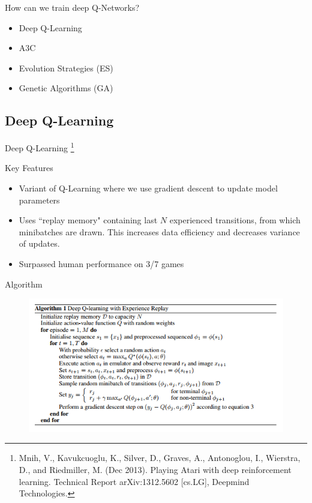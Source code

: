 \documentclass{beamer}
\begin{document}
	\begin{frame}
		How can we train deep Q-Networks?
		\begin{itemize}
			\item Deep Q-Learning
			\item A3C
			\item Evolution Strategies (ES)
			\item Genetic Algorithms (GA)
		\end{itemize}
	\end{frame}
	
	\subsection*{Deep Q-Learning}
	
	\begin{frame}
		\Huge Deep Q-Learning
		\footnote{Mnih, V., Kavukcuoglu, K., Silver, D., Graves, A., Antonoglou, I., Wierstra, D., and Riedmiller, M.
(Dec 2013). Playing Atari with deep reinforcement learning. Technical Report arXiv:1312.5602
[cs.LG], Deepmind Technologies.}
	\end{frame}
	
	\begin{frame}{Key Features}
		\begin{itemize}
			\item Variant of Q-Learning where we use gradient descent to update model parameters
			\item Uses ``replay memory" containing last $N$ experienced transitions, from which minibatches are drawn. This increases data efficiency and decreases variance of updates.
			\item Surpassed human performance on 3/7 games
		\end{itemize}
	\end{frame}
	
	\begin{frame}{Algorithm}
		\begin{figure}
			\centering
			\includegraphics[height=0.7\textheight]{dqn_algorithm.png}
		\end{figure}
	\end{frame}
	
\end{document}

